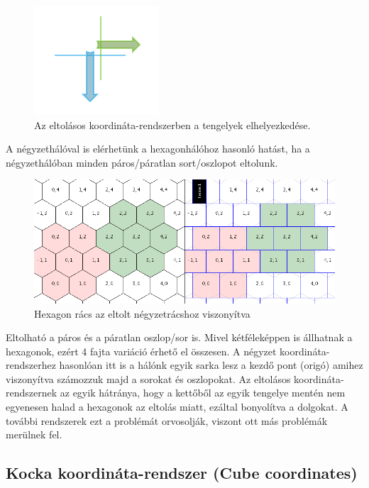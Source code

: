 \begin{figure}[h]
\centering
\includegraphics[scale=0.5]{kepek/img41.png}
\caption{Az eltolásos koordináta-rendszerben a tengelyek elhelyezkedése.}
\label{fig:img41}
\end{figure}

\noindent A négyzethálóval is elérhetünk a hexagonhálóhoz hasonló hatást, ha a négyzethálóban minden páros/páratlan sort/oszlopot eltolunk.

\begin{figure}[h]
\centering
\includegraphics[scale=0.5]{kepek/img42.png}
\caption{Hexagon rács az eltolt négyzetrácshoz viszonyítva}
\label{fig:img42}
\end{figure}

Eltolható a páros és a páratlan oszlop/sor is. Mivel kétféleképpen is állhatnak a hexagonok, ezért 4 fajta variáció érhető el összesen.
\newline
\newline A négyzet koordináta-rendszerhez hasonlóan itt is a hálónk egyik sarka lesz a kezdő pont (origó) amihez viszonyítva számozzuk majd a sorokat és oszlopokat.
\newline
\newline Az eltolásos koordináta-rendszernek az egyik hátránya, hogy a kettőből az egyik tengelye mentén nem egyenesen halad a hexagonok az eltolás miatt, ezáltal bonyolítva a dolgokat. A további rendszerek ezt a problémát orvosolják, viszont ott más problémák merülnek fel.		

\subsection{Kocka koordináta-rendszer (Cube coordinates)}

